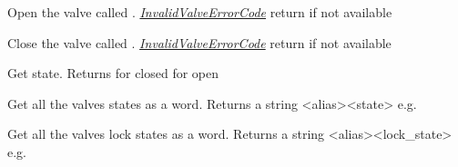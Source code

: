 \documentclass[letterpaper,10pt,english]{sphinxmanual}
\begin{document}
\begin{fulllineitems}
Open the valve called . {\hyperref[system_errors:invalid-valve-error]{\emph{InvalidValveErrorCode}}} return if  not available

\end{fulllineitems}



\begin{fulllineitems}
Close the valve called . {\hyperref[system_errors:invalid-valve-error]{\emph{InvalidValveErrorCode}}} return if  not available

\end{fulllineitems}



\begin{fulllineitems}
Get  state. Returns  for closed  for open

\end{fulllineitems}



\begin{fulllineitems}
Get all the valves states as a word. Returns a string \textless{}alias\textgreater{}\textless{}state\textgreater{} e.g. 

\end{fulllineitems}



\begin{fulllineitems}
Get all the valves lock states as a word. Returns a string \textless{}alias\textgreater{}\textless{}lock\_state\textgreater{} e.g. 

\end{fulllineitems}



\begin{fulllineitems}
\end{fulllineitems}



\begin{fulllineitems}
\end{fulllineitems}



\begin{fulllineitems}
\end{fulllineitems}
\end{document}

